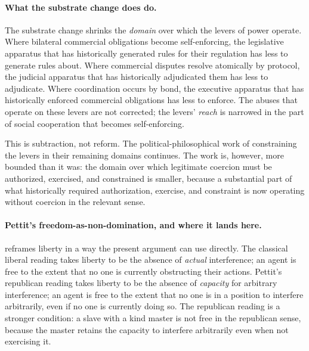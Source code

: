 \documentclass[11pt,a4paper]{article}
\theoremstyle{remark}
\begin{document}
\paragraph{What the substrate change does do.}
The substrate change shrinks the \emph{domain} over which the
levers of power operate. Where bilateral commercial obligations
become self-enforcing, the legislative apparatus that has
historically generated rules for their regulation has less to
generate rules about. Where commercial disputes resolve
atomically by protocol, the judicial apparatus that has
historically adjudicated them has less to adjudicate. Where
coordination occurs by bond, the executive apparatus that has
historically enforced commercial obligations has less to enforce.
The abuses that operate on these levers are not corrected; the
levers' \emph{reach} is narrowed in the part of social
cooperation that becomes self-enforcing.

This is subtraction, not reform. The political-philosophical
work of constraining the levers in their remaining domains
continues. The work is, however, more bounded than it was: the
domain over which legitimate coercion must be authorized,
exercised, and constrained is smaller, because a substantial
part of what historically required authorization, exercise, and
constraint is now operating without coercion in the relevant
sense.

\paragraph{Pettit's freedom-as-non-domination, and where it lands here.}
\citet{pettit1997republicanism} reframes liberty in a way the
present argument can use directly. The classical liberal reading
takes liberty to be the absence of \emph{actual} interference; an
agent is free to the extent that no one is currently obstructing
their actions. Pettit's republican reading takes liberty to be the
absence of \emph{capacity} for arbitrary interference; an agent is
free to the extent that no one is in a position to interfere
arbitrarily, even if no one is currently doing so. The republican
reading is a stronger condition: a slave with a kind master is not
free in the republican sense, because the master retains the
capacity to interfere arbitrarily even when not exercising it.
\end{document}
